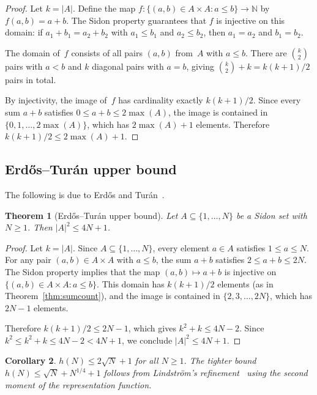 \documentclass[11pt]{amsart}
\theoremstyle{plain}
\newtheorem{theorem}{Theorem}[section]
\newtheorem{corollary}[theorem]{Corollary}
\theoremstyle{definition}
\theoremstyle{remark}
\begin{document}
\begin{proof}
Let $k = |A|$.
Define the map
$f\colon \{(a,b) \in A \times A : a \le b\} \to \mathbb{N}$ by
$f(a,b) = a + b$.
The Sidon property guarantees that $f$ is injective on this domain:
if $a_1 + b_1 = a_2 + b_2$ with $a_1 \le b_1$ and $a_2 \le b_2$,
then $a_1 = a_2$ and $b_1 = b_2$.

The domain of~$f$ consists of all pairs $(a,b)$ from~$A$ with
$a \le b$.
There are $\binom{k}{2}$ pairs with $a < b$ and $k$ diagonal pairs
with $a = b$, giving $\binom{k}{2} + k = k(k+1)/2$ pairs in total.

By injectivity, the image of~$f$ has cardinality exactly $k(k+1)/2$.
Since every sum $a + b$ satisfies $0 \le a + b \le 2\max(A)$, the
image is contained in $\{0, 1, \dots, 2\max(A)\}$, which has
$2\max(A) + 1$ elements.
Therefore $k(k+1)/2 \le 2\max(A) + 1$.
\end{proof}

\subsection{Erd\H{o}s--Tur\'an upper bound}

The following is due to Erd\H{o}s and Tur\'an~\cite{erdos_turan_1941}.

\begin{theorem}[Erd\H{o}s--Tur\'an upper bound]\label{thm:erdos_turan}
Let $A \subseteq \{1,\dots,N\}$ be a Sidon set with $N \ge 1$.
Then $|A|^2 \le 4N + 1$.
\end{theorem}

\begin{proof}
Let $k = |A|$.
Since $A \subseteq \{1,\dots,N\}$, every element $a \in A$ satisfies
$1 \le a \le N$.
For any pair $(a,b) \in A \times A$ with $a \le b$, the sum
$a + b$ satisfies $2 \le a + b \le 2N$.
The Sidon property implies that the map $(a,b) \mapsto a + b$ is
injective on $\{(a,b) \in A \times A : a \le b\}$.
This domain has $k(k+1)/2$ elements (as in
Theorem~\ref{thm:sumcount}), and the image is contained in
$\{2, 3, \dots, 2N\}$, which has $2N - 1$ elements.

Therefore $k(k+1)/2 \le 2N - 1$, which gives
$k^2 + k \le 4N - 2$.
Since $k^2 \le k^2 + k \le 4N - 2 < 4N + 1$, we conclude
$|A|^2 \le 4N + 1$.
\end{proof}

\begin{corollary}\label{cor:et}
$h(N) \le 2\sqrt{N} + 1$ for all $N \ge 1$.
The tighter bound $h(N) \le \sqrt{N} + N^{1/4} + 1$ follows from
Lindstr\"om's refinement~\cite{lindstrom_1969} using the second
moment of the representation function.
\end{corollary}
\end{document}
